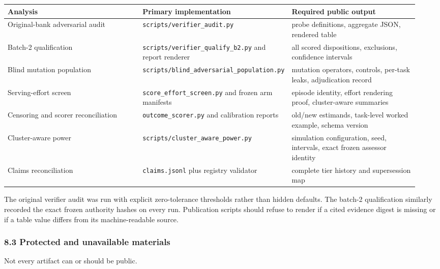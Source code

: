 \documentclass[
  9pt,
  letterpaper,
]{article}
\begin{document}
\begin{longtable}[]{@{}p{0.34\linewidth}p{0.28\linewidth}p{0.32\linewidth}@{}}
\toprule\noalign{}
Analysis & Primary implementation & Required public output \\
\midrule\noalign{}
\endhead
\bottomrule\noalign{}
\endlastfoot
Original-bank adversarial audit & \texttt{scripts/verifier\_audit.py} &
probe definitions, aggregate JSON, rendered table \\
Batch-2 qualification & \texttt{scripts/verifier\_qualify\_b2.py} and
report renderer & all scored dispositions, exclusions, confidence
intervals \\
Blind mutation population &
\texttt{scripts/blind\_adversarial\_population.py} & mutation operators,
controls, per-task leaks, adjudication record \\
Serving-effort screen & \texttt{score\_effort\_screen.py} and frozen arm
manifests & episode identity, effort rendering proof, cluster-aware
summaries \\
Censoring and scorer reconciliation & \texttt{outcome\_scorer.py} and
calibration reports & old/new estimands, task-level worked example,
schema version \\
Cluster-aware power & \texttt{scripts/cluster\_aware\_power.py} &
simulation configuration, seed, intervals, exact frozen assessor
identity \\
Claims reconciliation & \texttt{claims.jsonl} plus registry validator &
complete tier history and supersession map \\
\end{longtable}

The original verifier audit was run with explicit zero-tolerance
thresholds rather than hidden defaults. The batch-2 qualification
similarly recorded the exact frozen authority hashes on every run.
Publication scripts should refuse to render if a cited evidence digest
is missing or if a table value differs from its machine-readable source.

\hypertarget{83-protected-and-unavailable-materials}{%
\subsubsection{8.3 Protected and unavailable
materials}\label{83-protected-and-unavailable-materials}}

Not every artifact can or should be public.
\end{document}
